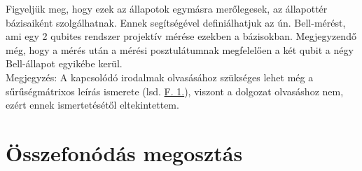 Figyeljük meg, hogy ezek az állapotok egymásra merőlegesek, az állapottér bázisaiként szolgálhatnak. Ennek segítségével definiálhatjuk az ún. Bell-mérést, ami egy 2 qubites rendszer projektív mérése ezekben a bázisokban. Megjegyzendő még, hogy a mérés után a mérési posztulátumnak megfelelően a két qubit a négy Bell-állapot egyikébe kerül.\\
Megjegyzés: A kapcsolódó irodalmak olvasásához szükséges lehet még a sűrűségmátrixos leírás ismerete (lsd. \hyperref[suru]{F. 1.}), viszont a dolgozat olvasáshoz nem, ezért ennek ismertetésétől eltekintettem.\\

\section{Összefonódás megosztás}
